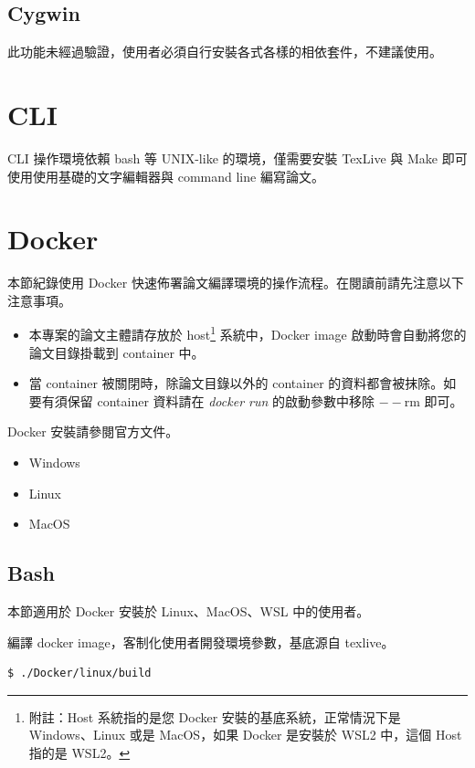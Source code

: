 \subsection{Cygwin}

此功能未經過驗證，使用者必須自行安裝各式各樣的相依套件，不建議使用。

\section{CLI}

CLI 操作環境依賴 bash 等 UNIX-like 的環境，僅需要安裝 TexLive 與 Make 即可使用使用基礎的文字編輯器與 command line 編寫論文。

\section{Docker}

本節紀錄使用 Docker 快速佈署論文編譯環境的操作流程。在閱讀前請先注意以下注意事項。

\begin{itemize}
        \item 本專案的論文主體請存放於 host\footnote{附註：Host 系統指的是您 Docker 安裝的基底系統，正常情況下是 Windows、Linux 或是 MacOS，如果 Docker 是安裝於 WSL2 中，這個 Host 指的是 WSL2。} 系統中，Docker image 啟動時會自動將您的論文目錄掛載到 container 中。
        \item 當 container 被關閉時，除論文目錄以外的 container 的資料都會被抹除。如要有須保留 container 資料請在 \emph{docker run} 的啟動參數中移除 $--$rm 即可。
\end{itemize}

Docker 安裝請參閱官方文件。

\begin{itemize}
        \item Windows\cite{win_docker}
        \item Linux\cite{linux_docker}
        \item MacOS\cite{mac_docker}
\end{itemize}

\subsection{Bash}

本節適用於 Docker 安裝於 Linux、MacOS、WSL 中的使用者。

編譯 docker image，客制化使用者開發環境參數，基底源自 texlive\cite{docker_texlive}。
\begin{lstlisting}[language=bash]
        $ ./Docker/linux/build
\end{lstlisting}

